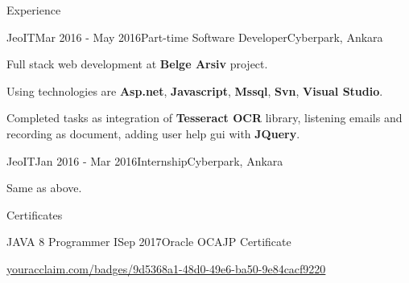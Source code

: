 \documentclass{resume} %
\begin{document}
\begin{rSection}{Experience}

\begin{rSubsection}{JeoIT}{Mar 2016 - May 2016}{Part-time Software Developer}{Cyberpark, Ankara}
\item Full stack web development at \textbf{Belge Arsiv} project.
\item Using technologies are \textbf{Asp.net}, \textbf{Javascript}, \textbf{Mssql}, \textbf{Svn}, \textbf{Visual Studio}.
\item Completed tasks as integration of \textbf{Tesseract OCR} library, listening emails and recording as document, adding user help gui with \textbf{JQuery}.
\end{rSubsection}


\begin{rSubsection}{JeoIT}{Jan 2016 - Mar 2016}{Internship}{Cyberpark, Ankara}
\item Same as above.
\end{rSubsection}

\end{rSection}



\begin{rSection}{Certificates}

\begin{rSubsection}{JAVA 8 Programmer I}{Sep 2017}{Oracle OCAJP Certificate}{}
\item \href{https://youracclaim.com/badges/9d5368a1-48d0-49e6-ba50-9e84cacf9220}{youracclaim.com/badges/9d5368a1-48d0-49e6-ba50-9e84cacf9220}
\end{rSubsection}

\end{rSection}

\end{document}
